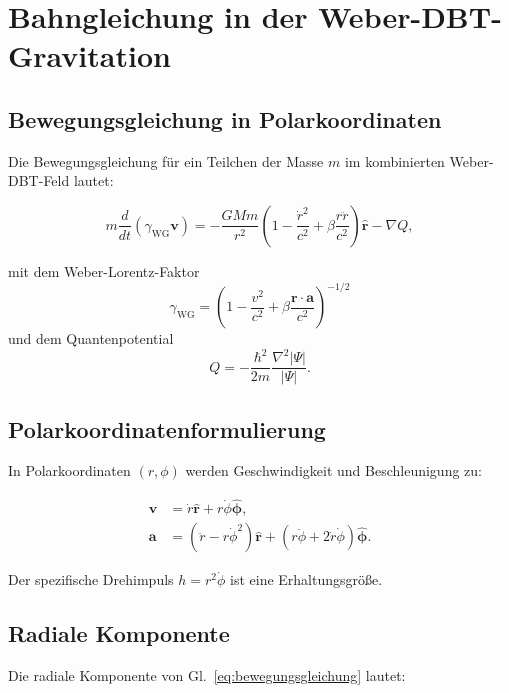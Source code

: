 \section{Bahngleichung in der Weber-DBT-Gravitation}
\label{sec:bahngleichung}

\subsection{Bewegungsgleichung in Polarkoordinaten}
Die Bewegungsgleichung für ein Teilchen der Masse \( m \) im kombinierten Weber-DBT-Feld lautet:

\begin{equation}
m \frac{d}{dt} (\gamma_{\text{WG}} \mathbf{v}) = -\frac{GMm}{r^2} \left(1 - \frac{\dot{r}^2}{c^2} + \beta \frac{r \ddot{r}}{c^2}\right) \hat{\mathbf{r}} - \nabla Q,
\label{eq:bewegungsgleichung}
\end{equation}

mit dem Weber-Lorentz-Faktor
\begin{equation}
\gamma_{\text{WG}} = \left(1 - \frac{v^2}{c^2} + \beta \frac{\mathbf{r} \cdot \mathbf{a}}{c^2}\right)^{-1/2}
\end{equation}
und dem Quantenpotential
\begin{equation}
Q = -\frac{\hbar^2}{2m} \frac{\nabla^2 |\Psi|}{|\Psi|}.
\end{equation}

\subsection{Polarkoordinatenformulierung}
In Polarkoordinaten \((r, \phi)\) werden Geschwindigkeit und Beschleunigung zu:

\begin{align}
\mathbf{v} &= \dot{r} \hat{\mathbf{r}} + r \dot{\phi} \hat{\boldsymbol{\phi}}, \\
\mathbf{a} &= (\ddot{r} - r \dot{\phi}^2) \hat{\mathbf{r}} + (r \ddot{\phi} + 2 \dot{r} \dot{\phi}) \hat{\boldsymbol{\phi}}.
\end{align}

Der spezifische Drehimpuls \( h = r^2 \dot{\phi} \) ist eine Erhaltungsgröße.

\subsection{Radiale Komponente}
Die radiale Komponente von Gl.~\eqref{eq:bewegungsgleichung} lautet:

